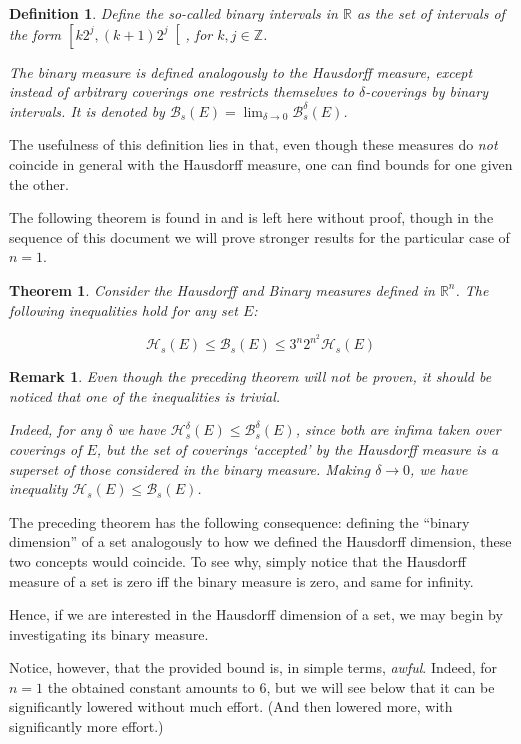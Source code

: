 \documentclass[11pt]{amsart}
\newcommand{\R}{\mathbb{R}}
\newcommand{\Z}{\mathbb{Z}}
\newcommand{\HH}{\mathcal{H}}
\newcommand{\BB}{\mathcal{B}}
\newtheorem{theorem}{Theorem}
\newtheorem{definition}{Definition}
\newtheorem{remark}{Remark}
\begin{document}
\begin{definition}
Define the so-called \emph{binary intervals} in $\R$ as the set of intervals of the form $\left[ k 2^j, (k+1) 2^j \right[$, for $k, j \in \Z$.

The binary measure is defined analogously to the Hausdorff measure, except instead of arbitrary coverings one restricts themselves to $\delta$-coverings by binary intervals. It is denoted by $\BB_s(E) = \lim_{\delta \to 0} \BB_s^\delta(E)$.
\end{definition}

The usefulness of this definition lies in that, even though these measures do \emph{not} coincide in general with the Hausdorff measure, one can find bounds for one given the other.

The following theorem is found in \cite{falconer} \cite{rogers} and is left here without proof, though in the sequence of this document we will prove stronger results for the particular case of $n = 1$.

\begin{theorem}\label{badbound}
Consider the Hausdorff and Binary measures defined in $\R^n$. The following inequalities hold for any set $E$:

\[ \HH_s(E) \leq \BB_s(E) \leq 3^n 2^{n^2} \HH_s(E) \]
\end{theorem}

\begin{remark}
Even though the preceding theorem will not be proven, it should be noticed that one of the inequalities is trivial.

Indeed, for any $\delta$ we have $\HH_s^\delta(E) \leq \BB_s^\delta(E)$, since both are infima taken over coverings of $E$, but the set of coverings `accepted' by the Hausdorff measure is a superset of those considered in the binary measure. Making $\delta \to 0$, we have inequality $\HH_s(E) \leq \BB_s(E)$.
\end{remark}

The preceding theorem has the following consequence: defining the ``binary dimension'' of a set analogously to how we defined the Hausdorff dimension, these two concepts would coincide. To see why, simply notice that the Hausdorff measure of a set is zero iff the binary measure is zero, and same for infinity.

Hence, if we are interested in the Hausdorff dimension of a set, we may begin by investigating its binary measure.

Notice, however, that the provided bound is, in simple terms, \emph{awful}. Indeed, for $n = 1$ the obtained constant amounts to 6, but we will see below that it can be significantly lowered without much effort. (And then lowered more, with significantly more effort.)
\end{document}
